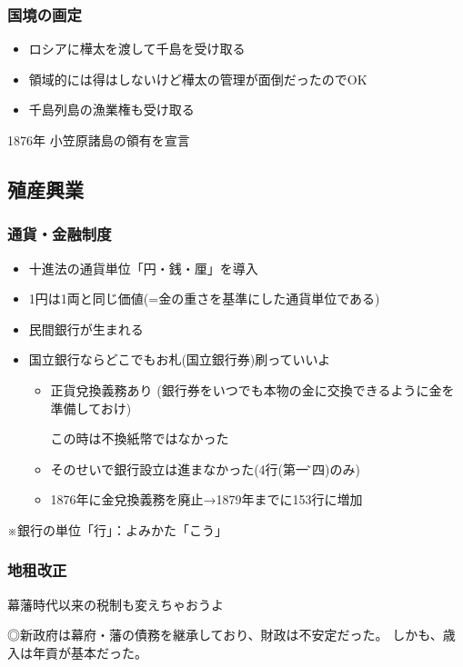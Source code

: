\documentclass[12pt]{ltjsarticle}
\begin{document}
\subsubsection{国境の画定}
\begin{itemize}
\item ロシアに樺太を渡して千島を受け取る
\item 領域的には得はしないけど樺太の管理が面倒だったのでOK
\item 千島列島の漁業権も受け取る
\end{itemize}
 
1876年 小笠原諸島の領有を宣言

\subsection{殖産興業}
\subsubsection{通貨・金融制度}
\begin{itemize}
\item 十進法の通貨単位「円・銭・厘」を導入
\item 1円は1両と同じ価値(=金の重さを基準にした通貨単位である)
\end{itemize}
\begin{itemize}
\item 民間銀行が生まれる
\item 国立銀行ならどこでもお札(国立銀行券)刷っていいよ
\begin{itemize}
\item 正貨兌換義務あり
(銀行券をいつでも本物の金に交換できるように金を準備しておけ)

この時は不換紙幣ではなかった
\item そのせいで銀行設立は進まなかった(4行(第一\~第四)のみ)
\item 1876年に金兌換義務を廃止→1879年までに153行に増加
\end{itemize}
\end{itemize}
※銀行の単位「行」：よみかた「こう」

\subsubsection{地租改正}
幕藩時代以来の税制も変えちゃおうよ

◎新政府は幕府・藩の債務を継承しており、財政は不安定だった。
しかも、歳入は年貢が基本だった。
\end{document}

